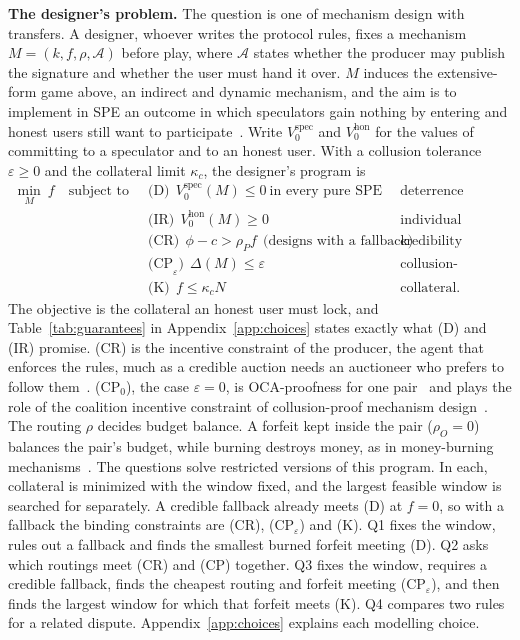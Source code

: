 \documentclass[11pt]{article}
\begin{document}
\textbf{The designer's problem.} The question is one of mechanism design with transfers. A designer, whoever writes the protocol rules, fixes a mechanism $M=(k,f,\rho,\mathcal A)$ before play, where $\mathcal A$ states whether the producer may publish the signature and whether the user must hand it over. $M$ induces the extensive-form game above, an indirect and dynamic mechanism, and the aim is to implement in SPE an outcome in which speculators gain nothing by entering and honest users still want to participate~\cite{moore1988spi}. Write $V_0^{\mathrm{spec}}$ and $V_0^{\mathrm{hon}}$ for the values of committing to a speculator and to an honest user. With a collusion tolerance $\varepsilon\ge0$ and the collateral limit $\kappa_c$, the designer's program is
\begin{align*}
\min_{M}\ f\quad\text{subject to}\quad
&\text{(D)}\ \ V_0^{\mathrm{spec}}(M)\le 0\ \text{in every pure SPE} &&\text{deterrence}\\
&\text{(IR)}\ \ V_0^{\mathrm{hon}}(M)\ge 0 &&\text{individual rationality}\\
&\text{(CR)}\ \ \phi-c>\rho_P f\ \ \text{(designs with a fallback)} &&\text{credibility}\\
&\text{(CP}_\varepsilon\text{)}\ \ \Delta(M)\le\varepsilon &&\text{collusion-proofness}\\
&\text{(K)}\ \ f\le\kappa_c N &&\text{collateral.}
\end{align*}
The objective is the collateral an honest user must lock, and Table~\ref{tab:guarantees} in Appendix~\ref{app:choices} states exactly what (D) and (IR) promise. (CR) is the incentive constraint of the producer, the agent that enforces the rules, much as a credible auction needs an auctioneer who prefers to follow them~\cite{akbarpour2020credible}. (CP$_0$), the case $\varepsilon=0$, is OCA-proofness for one pair~\cite{roughgarden2021tfm} and plays the role of the coalition incentive constraint of collusion-proof mechanism design~\cite{laffont1997collusion}. The routing $\rho$ decides budget balance. A forfeit kept inside the pair ($\rho_O=0$) balances the pair's budget, while burning destroys money, as in money-burning mechanisms~\cite{hartline2008burning}. The questions solve restricted versions of this program. In each, collateral is minimized with the window fixed, and the largest feasible window is searched for separately. A credible fallback already meets (D) at $f=0$, so with a fallback the binding constraints are (CR), (CP$_\varepsilon$) and (K). Q1 fixes the window, rules out a fallback and finds the smallest burned forfeit meeting (D). Q2 asks which routings meet (CR) and (CP) together. Q3 fixes the window, requires a credible fallback, finds the cheapest routing and forfeit meeting (CP$_\varepsilon$), and then finds the largest window for which that forfeit meets (K). Q4 compares two rules for a related dispute. Appendix~\ref{app:choices} explains each modelling choice.
\end{document}
